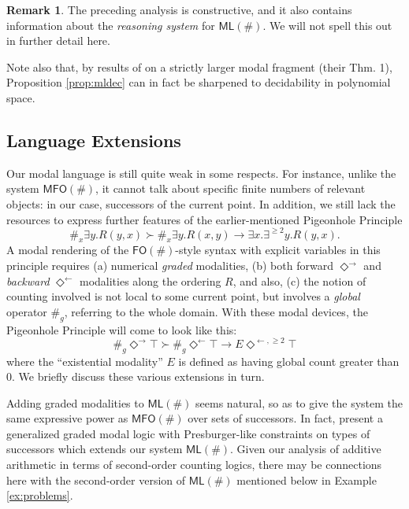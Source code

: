 \documentclass[12pt,oneside,reqno]{amsart}
\theoremstyle{definition}
\newtheorem{remark}{Remark}
\begin{document}
\begin{remark} The preceding analysis is constructive, and it also contains information about the \emph{reasoning system} for $\mathsf{ML}(\#)$. We will not spell this out in further detail here.

Note also that, by results of \cite{DEMRI2010233} on a strictly larger modal fragment (their Thm. 1), Proposition \ref{prop:mldec} can in fact be sharpened to decidability in polynomial space. 
\end{remark}

\subsection{Language Extensions} 

Our modal language is still quite weak in some respects. For instance, unlike the system $\mathsf{MFO}(\#)$, it cannot talk about specific finite numbers of relevant objects: in our case, successors of the current point. In addition, we still lack the resources to express further features of the earlier-mentioned Pigeonhole Principle  
\begin{equation} \label{eq:rphp} \#_x\exists y. R(y,x) \succ \#_x\exists y. R(x,y) \rightarrow \exists x. \exists^{\geq 2} y. R(y,x). \end{equation}  
A modal rendering of the $\mathsf{FO}(\#)$-style  syntax with explicit variables  in this principle requires (a) numerical  \emph{graded} modalities, (b) both forward $\Diamond^{\rightarrow}$ and \emph{backward} $\Diamond^{\leftarrow}$ modalities along the ordering $R$, and also, (c) the notion of counting involved is not local to some current point, but involves a \emph{global} operator $\#_g$, referring to the whole domain. With these modal devices, the Pigeonhole Principle will come to look like this:
\begin{equation} \label{eq:rphp2}\#_g \Diamond^{\rightarrow}\top   \succ \#_g \Diamond^{\leftarrow}\top   \rightarrow E \Diamond^{\leftarrow, \geq 2} \top \end{equation}
where the ``existential modality'' $E$ is defined as having global count greater than 0. We briefly discuss these various extensions in turn. 

Adding graded modalities to  $\mathsf{ML}(\#)$ seems natural, so as to give the system the same expressive power as $\mathsf{MFO}(\#)$ over sets of successors. %
In fact, \cite{DEMRI2010233} present a generalized graded modal logic with Presburger-like constraints on types of successors which extends our system $\mathsf{ML}(\#)$. Given our analysis of additive arithmetic in terms of second-order counting logics, there may be connections here with the second-order version of $\mathsf{ML}(\#)$ mentioned below in Example \ref{ex:problems}.
\end{document}
